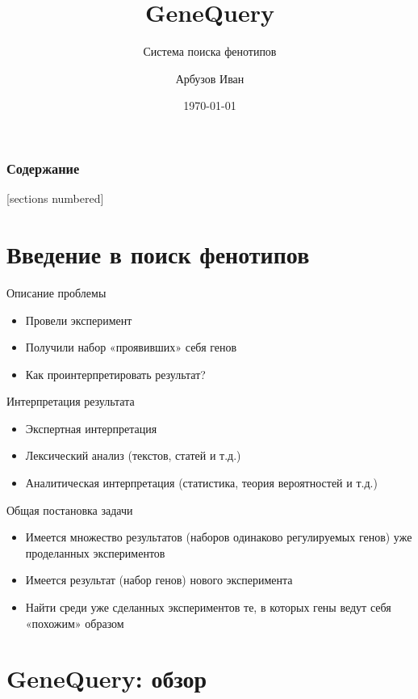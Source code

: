 \documentclass[10pt,pdf,utf8,russian,aspectratio=169]{beamer}
\title{GeneQuery}
\subtitle{Система поиска фенотипов}
\date{\today}
\author{Арбузов Иван}
\institute{Институт Биоинформатики}
\begin{document}
\maketitle

\begin{frame}
  \frametitle{Содержание}
  [sections numbered]
  \tableofcontents
\end{frame}

\section{Введение в поиск фенотипов}

\begin{frame}{Описание проблемы}
  \begin{itemize}[<+->]
    \item Провели эксперимент
    \item Получили набор «проявивших» себя генов
    \item \alert{Как проинтерпретировать результат?}
  \end{itemize}
\end{frame}

\begin{frame}{Интерпретация результата}
  \begin{itemize}[<+->]
    \item Экспертная интерпретация
    \item Лексический анализ (текстов, статей и т.д.)
    \item \alert<4> {Аналитическая интерпретация (статистика, теория вероятностей и т.д.)}
  \end{itemize}
\end{frame}

\begin{frame}{Общая постановка задачи}
  \begin{itemize}[<+->]
    \item Имеется множество результатов (наборов одинаково регулируемых генов) уже проделанных экспериментов
    \item Имеется результат (набор генов) нового эксперимента
    \item Найти среди уже сделанных экспериментов те, в которых гены ведут себя \alert<4>{«похожим»} образом
  \end{itemize}
\end{frame}


\section{GeneQuery: обзор}
\end{document}
